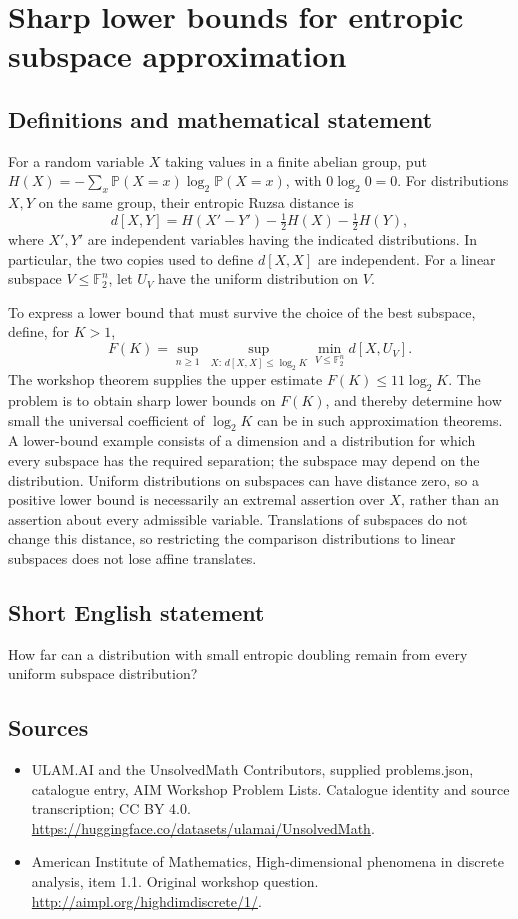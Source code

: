 \documentclass[11pt,a4paper]{article}
\begin{document}
\section*{Sharp lower bounds for entropic subspace approximation}\label{statement}

\subsection{Definitions and mathematical statement}
For a random variable $X$ taking values in a finite abelian group, put
$H(X)=-\sum_x\mathbb P(X=x)\log_2\mathbb P(X=x)$, with $0\log_2 0=0$.
For distributions $X,Y$ on the same group, their entropic Ruzsa distance is
\[
 d[X,Y]=H(X'-Y')-\tfrac12 H(X)-\tfrac12 H(Y),
\]
where $X',Y'$ are independent variables having the indicated distributions.
In particular, the two copies used to define $d[X,X]$ are independent.
For a linear subspace $V\leq\mathbb F_2^n$, let $U_V$ have the uniform distribution on $V$.

To express a lower bound that must survive the choice of the best subspace, define, for $K>1$,
\[
 F(K)=\sup_{n\geq1}\ \sup_{X:\,d[X,X]\leq\log_2 K}
             \min_{V\leq\mathbb F_2^n}d[X,U_V].
\]
The workshop theorem supplies the upper estimate $F(K)\leq11\log_2 K$.
The problem is to obtain sharp lower bounds on $F(K)$, and thereby determine how small the universal coefficient of $\log_2 K$ can be in such approximation theorems.
A lower-bound example consists of a dimension and a distribution for which every subspace has the required separation; the subspace may depend on the distribution.
Uniform distributions on subspaces can have distance zero, so a positive lower bound is necessarily an extremal assertion over $X$, rather than an assertion about every admissible variable.
Translations of subspaces do not change this distance, so restricting the comparison distributions to linear subspaces does not lose affine translates.
\subsection{Short English statement}
How far can a distribution with small entropic doubling remain from every uniform subspace distribution?
\subsection{Sources}
\begin{itemize}
\item[S1] ULAM.AI and the UnsolvedMath Contributors, supplied problems.json, catalogue entry, AIM Workshop Problem Lists. Catalogue identity and source transcription; CC BY 4.0.
\url{https://huggingface.co/datasets/ulamai/UnsolvedMath}.
\item[S2] American Institute of Mathematics, High-dimensional phenomena in discrete analysis, item 1.1. Original workshop question.
\url{http://aimpl.org/highdimdiscrete/1/}.
\end{itemize}
\end{document}
